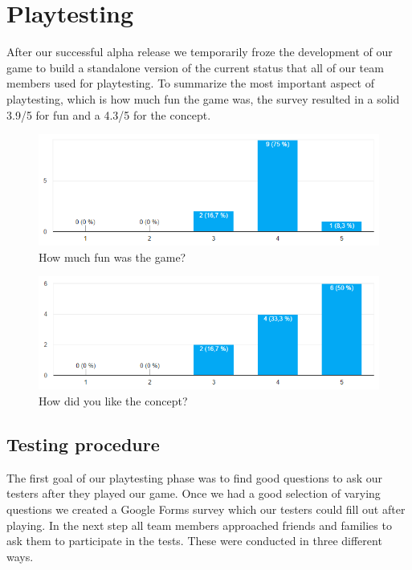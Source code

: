 \documentclass[12pt, letterpaper]{scrartcl}
\begin{document}
	 \section{Playtesting}
	 After our successful alpha release we temporarily froze the development of our game to build a standalone version of the current status that all of our team members used for playtesting. To summarize the most important aspect of playtesting, which is how much fun the game was, the survey resulted in a solid 3.9/5 for fun and a 4.3/5 for the concept.
	 \begin{figure}[H]
	 	\centering
	 	\includegraphics[width=\textwidth]{images/playtesting/fun}
	 	\caption{How much fun was the game?}
	 	\label{fig:fun}
	 \end{figure}
	 \begin{figure}[H]
	 	\centering
	 	\includegraphics[width=\textwidth]{images/playtesting/concept}
	 	\caption{How did you like the concept? }
	 	\label{fig:concept}
	 \end{figure}
	 
	 \subsection{Testing procedure}
	 The first goal of our playtesting phase was to find good questions to ask our testers after they played our game. Once we had a good selection of varying questions we created a Google Forms survey which our testers could fill out after playing. In the next step all team members approached friends and families to ask them to participate in the tests. These were conducted in three different ways. 
	 
\end{document}
